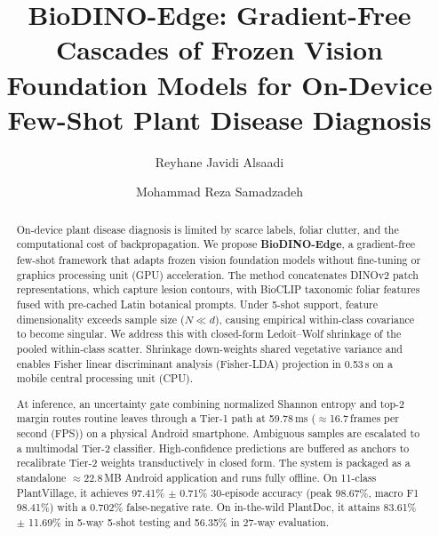 \documentclass[preprint,12pt]{elsarticle}
\begin{document}
\begin{frontmatter}

\title{BioDINO-Edge: Gradient-Free Cascades of Frozen Vision Foundation Models for On-Device Few-Shot Plant Disease Diagnosis}

\author[1]{Reyhane Javidi Alsaadi}

\author[1]{Mohammad Reza Samadzadeh}



\begin{abstract}
On-device plant disease diagnosis is limited by scarce labels, foliar clutter, and the computational cost of backpropagation. We propose \textbf{BioDINO-Edge}, a gradient-free few-shot framework that adapts frozen vision foundation models without fine-tuning or graphics processing unit (GPU) acceleration. The method concatenates DINOv2 patch representations, which capture lesion contours, with BioCLIP taxonomic foliar features fused with pre-cached Latin botanical prompts. Under 5-shot support, feature dimensionality exceeds sample size ($N \ll d$), causing empirical within-class covariance to become singular. We address this with closed-form Ledoit--Wolf shrinkage of the pooled within-class scatter. Shrinkage down-weights shared vegetative variance and enables Fisher linear discriminant analysis (Fisher-LDA) projection in 0.53\,s on a mobile central processing unit (CPU).

At inference, an uncertainty gate combining normalized Shannon entropy and top-2 margin routes routine leaves through a Tier-1 path at 59.78\,ms ($\approx$16.7\,frames per second (FPS)) on a physical Android smartphone. Ambiguous samples are escalated to a multimodal Tier-2 classifier. High-confidence predictions are buffered as anchors to recalibrate Tier-2 weights transductively in closed form. The system is packaged as a standalone $\approx$22.8\,MB Android application and runs fully offline. On 11-class PlantVillage, it achieves 97.41\% $\pm$ 0.71\% 30-episode accuracy (peak 98.67\%, macro F1 98.41\%) with a 0.702\% false-negative rate. On in-the-wild PlantDoc, it attains 83.61\% $\pm$ 11.69\% in 5-way 5-shot testing and 56.35\% in 27-way evaluation.
\end{abstract}


\end{frontmatter}
\end{document}
